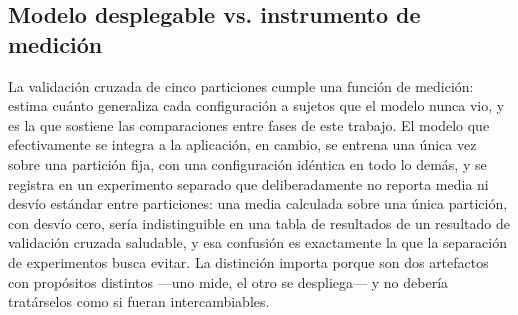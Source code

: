 \documentclass[10pt,a4paper,twocolumn]{article}
\begin{document}
\subsection{Modelo desplegable vs. instrumento de medición}
La validación cruzada de cinco particiones cumple una función de medición:
estima cuánto generaliza cada configuración a sujetos que el modelo nunca
vio, y es la que sostiene las comparaciones entre fases de este trabajo. El
modelo que efectivamente se integra a la aplicación, en cambio, se entrena
una única vez sobre una partición fija, con una configuración idéntica en
todo lo demás, y se registra en un experimento separado que deliberadamente
no reporta media ni desvío estándar entre particiones: una media calculada
sobre una única partición, con desvío cero, sería indistinguible en una tabla
de resultados de un resultado de validación cruzada saludable, y esa
confusión es exactamente la que la separación de experimentos busca evitar.
La distinción importa porque son dos artefactos con propósitos distintos
—uno mide, el otro se despliega— y no debería tratárselos como si fueran
intercambiables.
\end{document}
